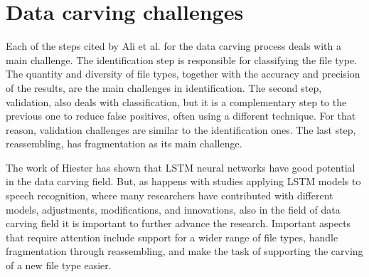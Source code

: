 \section{Data carving challenges}

Each of the steps cited by Ali et al. \cite{ali_review_2018} for the data carving process deals with a main challenge. The identification step is responsible for classifying the file type. The quantity and diversity of file types, together with the accuracy and precision of the results, are the main challenges in identification. The second step, validation, also deals with classification, but it is a complementary step to the previous one to reduce false positives, often using a different technique. For that reason, validation challenges are similar to the identification ones. The last step, reassembling, has fragmentation as its main challenge.

The work of Hiester \cite{hiester_file_2018} has shown that LSTM neural networks have good potential in the data carving field. But, as happens with studies applying LSTM models to speech recognition, where many researchers have contributed with different models, adjustments, modifications, and innovations, also in the field of data carving field it is important to further advance the research. Important aspects that require attention include support for a wider range of file types, handle fragmentation through reassembling, and make the task of supporting the carving of a new file type easier.




